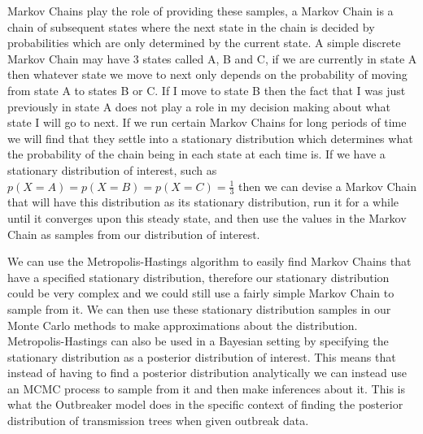 \documentclass{article}
\begin{document}
Markov Chains play the role of providing these samples, a Markov Chain is a chain of subsequent states where the next state in the chain is decided by probabilities which are only determined by the current state. A simple discrete Markov Chain may have 3 states called A, B and C, if we are currently in state A then whatever state we move to next only depends on the probability of moving from state A to states B or C. If I move to state B then the fact that I was just previously in state A does not play a role in my decision making about what state I will go to next. If we run certain Markov Chains for long periods of time we will find that they settle into a stationary distribution which determines what the probability of the chain being in each state at each time is. If we have a stationary distribution of interest, such as $p(X=A)=p(X=B)=p(X=C)=\frac{1}{3}$ then we can devise a Markov Chain that will have this distribution as its stationary distribution, run it for a while until it converges upon this steady state, and then use the values in the Markov Chain as samples from our distribution of interest.

We can use the Metropolis-Hastings algorithm to easily find Markov Chains that have a specified stationary distribution, therefore our stationary distribution could be very complex and we could still use a fairly simple Markov Chain to sample from it. We can then use these stationary distribution samples in our Monte Carlo methods to make approximations about the distribution. Metropolis-Hastings can also be used in a Bayesian setting by specifying the stationary distribution as a posterior distribution of interest. This means that instead of having to find a posterior distribution analytically we can instead use an MCMC process to sample from it and then make inferences about it. This is what the Outbreaker model does in the specific context of finding the posterior distribution of transmission trees when given outbreak data.
\end{document}
